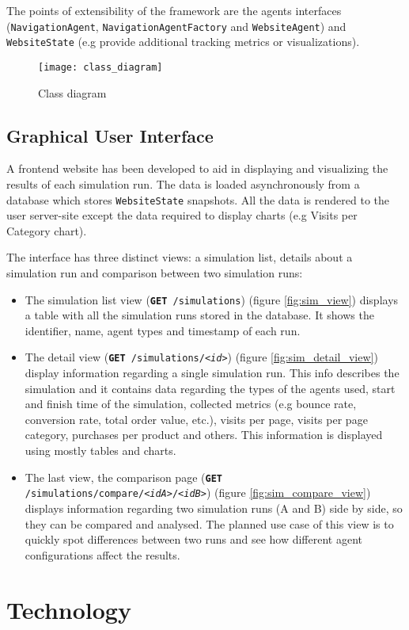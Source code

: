 The points of extensibility of the framework are the agents interfaces 
(\texttt{NavigationAgent}, \texttt{NavigationAgentFactory} and 
\texttt{WebsiteAgent}) and \texttt{WebsiteState} (e.g provide additional 
tracking metrics or visualizations).

\begin{figure}[p]
    \begin{center}
        \leavevmode
        \texttt{[image: class\_diagram]}
        \caption{Class diagram}
        \label{fig:class}
    \end{center}
\end{figure}

\subsection{Graphical User Interface}

A frontend website has been developed to aid in displaying and visualizing the 
results of each simulation run. The data is loaded asynchronously from a 
database which stores \texttt{WebsiteState} snapshots. All the data is rendered 
to the user server-site except the data required to display charts (e.g Visits 
per Category chart).

The interface has three distinct views: a simulation list, details about a 
simulation run and comparison between two simulation runs:

\begin{itemize}
    \item The simulation list view (\texttt{\textbf{GET} /simulations}) (figure 
    \ref{fig:sim_view}) displays a table 
    with all the simulation runs stored in the database. It shows the 
    identifier, name, agent types and timestamp of each run.
    \item The detail view (\texttt{\textbf{GET} /simulations/\textit{<id>}}) 
    (figure \ref{fig:sim_detail_view})
    display information regarding a single simulation run. This info describes 
    the simulation and it contains data regarding the types of the agents used, 
    start and finish time of the simulation, collected metrics (e.g bounce 
    rate, conversion rate, total order value, etc.), visits per page, visits 
    per page category, purchases per product and others. This information is 
    displayed using mostly tables and charts.
    \item The last view, the comparison page (\texttt{\textbf{GET} 
    /simulations/compare/\textit{<idA>}/\textit{<idB>}}) (figure 
    \ref{fig:sim_compare_view}) displays information 
    regarding two simulation runs (A and B) side by side, so they can be 
    compared and analysed. The planned use case of this view is to quickly spot 
    differences between two runs and see how different agent configurations 
    affect the results.
\end{itemize}




\section{Technology}
